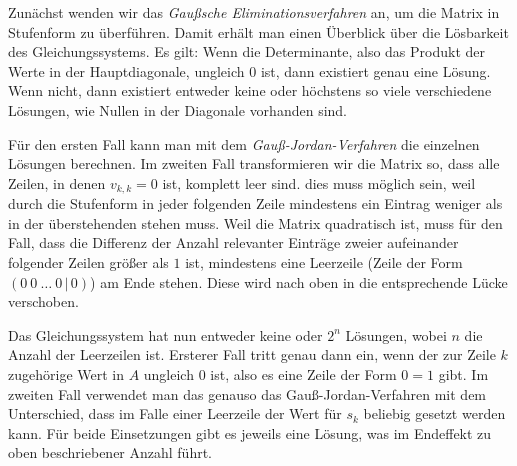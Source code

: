 \documentclass{scrartcl}
\begin{document}
Zunächst wenden wir das \emph{Gaußsche Eliminationsverfahren} an, um die
Matrix in Stufenform zu überführen. Damit erhält man einen Überblick über die
Lösbarkeit des Gleichungssystems. Es gilt: Wenn die Determinante, also das
Produkt der Werte in der Hauptdiagonale, ungleich $0$ ist, dann existiert genau
eine Lösung. Wenn nicht, dann existiert entweder keine oder höchstens so viele
verschiedene Lösungen, wie Nullen in der Diagonale vorhanden sind.

Für den ersten Fall kann man mit dem \emph{Gauß-Jordan-Verfahren} die einzelnen
Lösungen berechnen. Im zweiten Fall transformieren wir die Matrix so, dass alle
Zeilen, in denen $v_{k,k} = 0$ ist, komplett leer sind. dies muss möglich sein,
weil durch die Stufenform  in jeder folgenden Zeile mindestens ein Eintrag
weniger als in der überstehenden stehen muss. Weil die Matrix quadratisch ist,
muss für den Fall, dass die Differenz der Anzahl relevanter Einträge zweier
aufeinander folgender Zeilen größer als $1$ ist, mindestens eine Leerzeile 
(Zeile der Form $(0\ 0\ \dots\ 0\,|\,0)$) am Ende stehen. Diese wird nach oben
in die entsprechende Lücke verschoben.

Das Gleichungssystem hat nun entweder keine oder $2^n$ Lösungen, wobei $n$ die
Anzahl der Leerzeilen ist. Ersterer Fall tritt genau dann ein, wenn der zur
Zeile $k$ zugehörige Wert in $A$ ungleich $0$ ist, also es eine Zeile der Form
$0=1$ gibt. Im zweiten Fall verwendet man das genauso das Gauß-Jordan-Verfahren
mit dem Unterschied, dass im Falle einer Leerzeile der Wert für $s_k$ beliebig
gesetzt werden kann. Für beide Einsetzungen gibt es jeweils eine Lösung, was im
Endeffekt zu oben beschriebener Anzahl führt.
\end{document}
